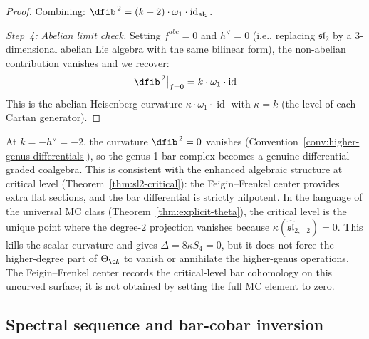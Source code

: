 \begin{proof}
Combining: $\dfib^{\,2} = (k+2) \cdot \omega_1 \cdot \operatorname{id}_{\mathfrak{sl}_2}$.

\emph{Step~4: Abelian limit check.}
Setting $f^{abc} = 0$ and $h^\vee = 0$ (i.e., replacing $\mathfrak{sl}_2$ by a $3$-dimensional abelian Lie algebra with the same bilinear form), the non-abelian contribution vanishes and we recover:
\begin{equation}
\dfib^{\,2}\big|_{f=0} = k \cdot \omega_1 \cdot \operatorname{id}
\end{equation}
This is the abelian Heisenberg curvature
$\kappa \cdot \omega_1 \cdot \operatorname{id}$ with
$\kappa = k$ (the level of each Cartan generator).
\end{proof}

\begin{remark}
At $k = -h^\vee = -2$, the curvature $\dfib^{\,2} = 0$ vanishes (Convention~\ref{conv:higher-genus-differentials}), so the genus-1 bar complex becomes a genuine differential graded coalgebra. This is consistent with the enhanced algebraic structure at critical level (Theorem~\ref{thm:sl2-critical}): the Feigin--Frenkel center provides extra flat sections, and the bar differential is strictly nilpotent.
In the language of the universal MC class
(Theorem~\ref{thm:explicit-theta}), the critical level is
the unique point where the degree-$2$ projection vanishes
because $\kappa(\widehat{\mathfrak{sl}}_{2,-2}) = 0$. This kills the scalar
curvature and gives $\Delta = 8\kappa S_4 = 0$, but it does
not force the higher-degree part of $\Theta_{\cA}$ to vanish or
annihilate the higher-genus operations. The Feigin--Frenkel center
records the critical-level bar cohomology on this uncurved
surface; it is not obtained by setting the full MC element to
zero.
\end{remark}

\subsection{Spectral sequence and bar-cobar inversion}

